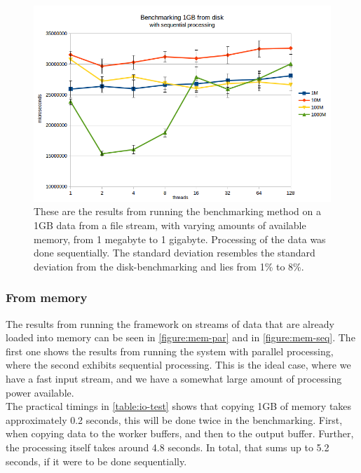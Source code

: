 \documentclass[a4paper]{article}
\begin{document}
\begin{figure}
	\begin{adjustwidth}{-0.5in}{-0.5in}
    \centering
     \includegraphics[scale=0.7]{../test_results/disk_seq.png}
  	\caption{These are the results from running the benchmarking method on a 1GB data from a file stream, with varying amounts of available memory, from 1 megabyte to 1 gigabyte. Processing of the data was done sequentially. The standard deviation resembles the standard deviation from the disk-benchmarking and lies from 1\% to 8\%.}
	\label{figure:disk-seq}
	\end{adjustwidth}
\end{figure}


\subsubsection{From memory}
The results from running the framework on streams of data that are already loaded into memory can be seen in \autoref{figure:mem-par} and in \autoref{figure:mem-seq}. The first one shows the results from running the system with parallel processing, where the second exhibits sequential processing. This is the ideal case, where we have a fast input stream, and we have a somewhat large amount of processing power available.\\

The practical timings in \autoref{table:io-test} shows that copying 1GB of memory takes approximately 0.2 seconds, this will be done twice in the benchmarking. First, when copying data to the worker buffers, and then to the output buffer. Further, the processing itself takes around 4.8 seconds. In total, that sums up to 5.2 seconds, if it were to be done sequentially.\\
\end{document}
